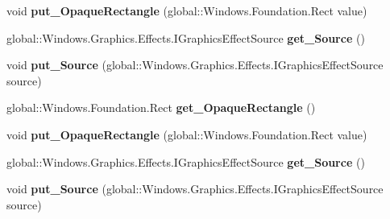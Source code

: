 \begin{DoxyCompactItemize}
void {\bfseries put\+\_\+\+Opaque\+Rectangle} (global\+::\+Windows.\+Foundation.\+Rect value)
\item 
\mbox{\label{interface_microsoft_1_1_graphics_1_1_canvas_1_1_effects_1_1_i_opacity_metadata_effect_a7f1a34bb43253b635aee805450475aaa}} 
global\+::\+Windows.\+Graphics.\+Effects.\+I\+Graphics\+Effect\+Source {\bfseries get\+\_\+\+Source} ()
\item 
\mbox{\label{interface_microsoft_1_1_graphics_1_1_canvas_1_1_effects_1_1_i_opacity_metadata_effect_a06d2f5d4d05d5fdfa3a069e971b03bb2}} 
void {\bfseries put\+\_\+\+Source} (global\+::\+Windows.\+Graphics.\+Effects.\+I\+Graphics\+Effect\+Source source)
\item 
\mbox{\label{interface_microsoft_1_1_graphics_1_1_canvas_1_1_effects_1_1_i_opacity_metadata_effect_ad52f7e81595788de05935a0e1a38785c}} 
global\+::\+Windows.\+Foundation.\+Rect {\bfseries get\+\_\+\+Opaque\+Rectangle} ()
\item 
\mbox{\label{interface_microsoft_1_1_graphics_1_1_canvas_1_1_effects_1_1_i_opacity_metadata_effect_ab7f3379a01dd6a1d5ee8ce00df3d373d}} 
void {\bfseries put\+\_\+\+Opaque\+Rectangle} (global\+::\+Windows.\+Foundation.\+Rect value)
\item 
\mbox{\label{interface_microsoft_1_1_graphics_1_1_canvas_1_1_effects_1_1_i_opacity_metadata_effect_a7f1a34bb43253b635aee805450475aaa}} 
global\+::\+Windows.\+Graphics.\+Effects.\+I\+Graphics\+Effect\+Source {\bfseries get\+\_\+\+Source} ()
\item 
\mbox{\label{interface_microsoft_1_1_graphics_1_1_canvas_1_1_effects_1_1_i_opacity_metadata_effect_a06d2f5d4d05d5fdfa3a069e971b03bb2}} 
void {\bfseries put\+\_\+\+Source} (global\+::\+Windows.\+Graphics.\+Effects.\+I\+Graphics\+Effect\+Source source)

\end{DoxyCompactItemize}
